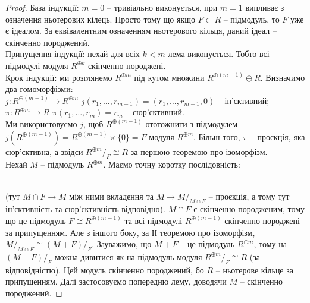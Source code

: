 \documentclass{math_library}
\begin{document}
\begin{proof}
База індукції: $m = 0$ -- тривіально виконується, при $m =1$ випливає з означення ньотерових кілець. Просто тому що якщо $F \subset R$ -- підмодуль, то $F$ уже є ідеалом. За еквівалентним означенням ньотерового кільця, даний ідеал -- скінченно породжений.\\
Припущення індукції: нехай для всіх $k < m$ лема виконується. Тобто всі підмодулі модуля $R^{\oplus k}$ скінченно породжені.\\
Крок індукції: ми розглянемо $R^{\oplus m}$ під кутом множини $R^{\oplus (m-1)} \oplus R$. Визначимо два гомоморфізми:\\
$j \colon R^{\oplus (m-1)} \to R^{\oplus m}$ \qquad $j(r_1,\dots,r_{m-1}) = (r_1,\dots,r_{m-1},0)$ -- ін'єктивний;\\
$\pi \colon R^{\oplus m} \to R$ \qquad\qquad $\pi(r_1,\dots,r_m) = r_m$ -- сюр'єктивний.\\
Ми використовуємо $j$, щоб $R^{\oplus (m-1)}$ ототожнити з підмодулем $j(R^{\oplus (m-1)}) = R^{\oplus (m-1)} \times \{0\} = F$ модуля $R^{\oplus m}$. Більш того, $\pi$ -- проєкція, яка сюр'єктивна, а звідси $R^{\oplus m}/_F \cong R$ за першою теоремою про ізоморфізм.\\
Нехай $M$ -- підмодуль $R^{\oplus m}$. Маємо точну коротку послідовність:\\
\\
(тут $M \cap F \to M$ між ними вкладення та $M \to M/_{M \cap F}$ -- проєкція, а тому тут ін'єктивність та сюр'єктивність відповідно). $M \cap F$ є скінченно породженим, тому що це підмодуль $F \cong R^{\oplus (m-1)}$ та всі підмодулі $R^{\oplus (m-1)}$ скінченно породжені за припущенням. Але з іншого боку, за ІІ теоремою про ізоморфізм, $M/_{M \cap F} \cong (M+F)/_F$. Зауважимо, що $M+F$ -- це підмодуль $R^{\oplus m}$, тому на $(M+F)/_F$ можна дивитися як на підмодуль модуля $R^{\oplus m}/_F \cong R$ (за відповідністю). Цей модуль скінченно породжений, бо $R$ -- ньотерове кільце за припущенням. Далі застосовуємо попередню лему, доводячи $M$ -- скінченно породжений.
\end{proof}
\end{document}
